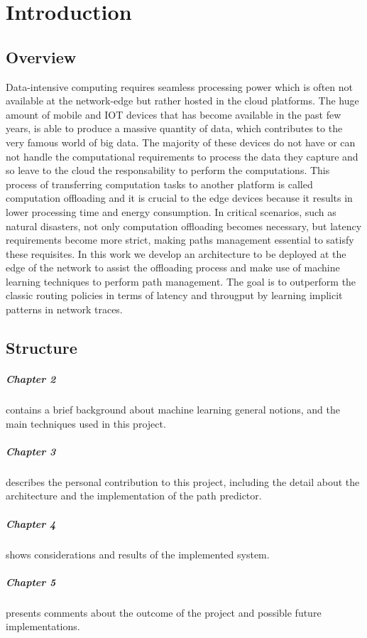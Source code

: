 \chapter{Introduction}

\section{Overview}
Data-intensive computing requires seamless processing power which is often not available at the network-edge but rather hosted in the cloud platforms. The huge amount of mobile and IOT devices that has become available in the past few years, is able to produce a massive quantity of data, which contributes to the very famous world of big data. The majority of these devices do not have or can not handle the computational requirements to process the data they capture and so leave to the cloud the responsability to perform the computations. This process of transferring computation tasks to another platform is called computation offloading and it is crucial to the edge devices because it results in lower processing
time and energy consumption. In critical scenarios, such as natural disasters, not only computation offloading becomes necessary, but latency requirements become more strict, making paths management essential to satisfy these requisites. In this work we develop an architecture to be deployed at the edge of the network to assist the offloading process and make use of machine learning techniques to perform path management. The goal is to outperform the classic routing policies in terms of latency and througput by learning implicit patterns in network traces.

\section{Structure}
\paragraph{Chapter 2} contains a brief background about machine learning general notions, and the main techniques used in this project.
\paragraph{Chapter 3} describes the personal contribution to this project, including the detail about the architecture and the implementation of the path predictor.
\paragraph{Chapter 4} shows considerations and results of the implemented system.
\paragraph{Chapter 5} presents comments about the outcome of the project and possible future implementations.

